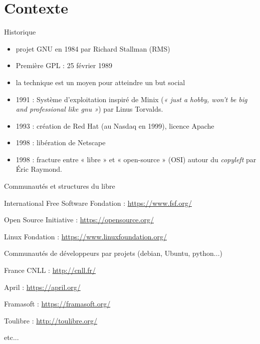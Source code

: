 \documentclass{beamer}
\begin{document}

\section{Contexte}

\begin{frame}{Historique}
  \begin{itemize}
  \item projet GNU en 1984 par Richard Stallman (RMS)
  \item Première GPL : 25 février 1989
  \item la technique est un moyen pour atteindre un but social
  \item 1991 : Système d'exploitation inspiré de Minix (\textit{« just
      a hobby, won’t be big and professional like gnu »}) par Linus
    Torvalds.
  \item 1993 : création de Red Hat (au Nasdaq en 1999), licence Apache
  \item 1998 : libération de Netscape
  \item 1998 : fracture entre « libre » et « open-source » (OSI)
    autour du \textit{copyleft} par Éric Raymond.
  \end{itemize}
\end{frame}


\begin{frame}[plain]%
%  
\end{frame}


\begin{frame}[plain]%
%  
\end{frame}

\begin{frame}{Communautés et structures du libre}

  \begin{block}{International}
    Free Software Fondation : \url{https://www.fsf.org/}

    Open Source Initiative : \url{https://opensource.org/}

    Linux Fondation : \url{https://www.linuxfoundation.org/}

    Communautés de développeurs par projets (debian, Ubuntu, python...)
  \end{block}

  \begin{block}{France}
    CNLL : \url{http://cnll.fr/}

    April : \url{https://april.org/}

    Framasoft : \url{https://framasoft.org/}

    Toulibre : \url{http://toulibre.org/}

    etc...
  \end{block}
\end{frame}
\end{document}

